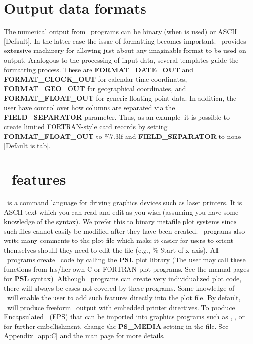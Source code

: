 \section{Output data formats}
\label{sec:output data}

The numerical output from \GMT\ programs can be binary (when  is used) or ASCII [Default].
In the latter case the issue of formatting becomes important.  \GMT\ provides extensive
machinery for allowing just about any imaginable format to be used on output.  Analogous to
the processing of input data, several templates guide the formatting process.  These are
\textbf{FORMAT\_DATE\_OUT} and \textbf{FORMAT\_CLOCK\_OUT} for calendar-time coordinates,
\textbf{FORMAT\_GEO\_OUT} for geographical coordinates, and \textbf{FORMAT\_FLOAT\_OUT} for generic
floating point data.  In addition, the user have control over how columns are separated via
the \textbf{FIELD\_SEPARATOR} parameter.  Thus, as an example, it is possible to create limited
FORTRAN-style card records by setting \textbf{FORMAT\_FLOAT\_OUT} to \%7.3lf and \textbf{FIELD\_SEPARATOR} to
none [Default is tab].

\section{\PS\ features}
\PS\ is a command language for driving graphics
devices such as laser printers.  It is ASCII text which you
can read and edit as you wish (assuming you have some knowledge
of the syntax).  We prefer this to binary metafile plot
systems since such files cannot easily be modified after they
have been created.  \GMT\ programs also write many comments to
the plot file which make it easier for users to orient
themselves should they need to edit the file (e.g., \% Start
of x-axis).  All \GMT\ programs create \PS\ code by
calling the \textbf{PSL} plot library (The user may call these
functions from his/her own C or FORTRAN plot programs. See the
manual pages for \textbf{PSL} syntax).  Although \GMT\ programs
can create very individualized plot code, there will always be
cases not covered by these programs.  Some knowledge of
\PS\ will enable the user to add such features
directly into the plot file.  By default, \GMT\ will produce
freeform \PS\ output with embedded printer directives.  To
produce Encapsulated \PS\ (EPS) that can be imported into graphics programs such as
, ,  or  for further
embellishment, change the \textbf{PS\_MEDIA} setting in the 
file.  See Appendix~\ref{app:C} and the  man page for more details.

